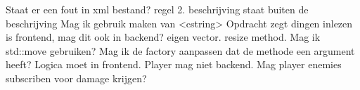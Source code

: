 Staat er een fout in xml bestand? regel 2. beschrijving staat buiten de beschrijving
Mag ik gebruik maken van <cstring>
Opdracht zegt dingen inlezen is frontend, mag dit ook in backend?
eigen vector. resize method. Mag ik std::move gebruiken?
Mag ik de factory aanpassen dat de methode een argument heeft?
Logica moet in frontend. Player mag niet backend. Mag player enemies subscriben voor damage krijgen?